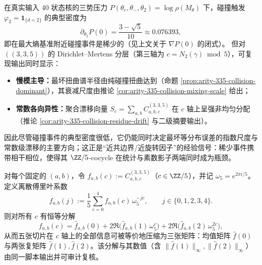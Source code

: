 \begin{corollary}\label{cor:arity-335-rare-collision-dominant}
在真实输入 40 状态核的三势压力 $P(\theta_e,\theta_-,\theta_2)=\log\rho(M_\theta)$ 下，碰撞触发 $\varphi_2=\mathbf{1}_{\{d=2\}}$ 的典型密度为
\[
\partial_{\theta_2}P(0)=\frac{3-\sqrt5}{10}\approx 0.076393,
\]
即在最大熵基准附近碰撞事件是稀少的（见上文关于 $\nabla P(0)$ 的闭式）。
但对 \(((3,3,5))\) 的 Dirichlet--Mertens 分层（第三轴为 $c=N_2(\gamma)\bmod 5$），可复现输出同时显示：
\begin{itemize}
  \item \textbf{慢模主导：}最坏扭曲谱半径由纯碰撞扭曲达到（命题 \ref{prop:arity-335-collision-dominant}），其衰减尺度由推论 \ref{cor:arity-335-collision-mixing-scale} 给出；
  \item \textbf{常数各向异性：}聚合漂移向量 $S_c=\sum_{a,b}C^{(3,3,5)}_{a,b,c}$ 在 $c$ 轴上呈强非均匀分配（推论 \ref{cor:arity-335-collision-residue-drift} 与二级摘要输出）。
\end{itemize}
因此尽管碰撞事件的典型密度很低，它仍能同时决定最坏等分布误差的指数尺度与常数级漂移的主要方向；这正是“近共边界/近旋转因子”的经验信号：稀少事件携带相干相位，使得其 \(\ZZ/5\)-cocycle 在统计与素数影子两端同时成为瓶颈。
\end{corollary}

\begin{proposition}\label{prop:arity-335-fourier-fingerprint}
对每个固定的 $(a,b)$，令 $f_{a,b}(c):=C^{(3,3,5)}_{a,b,c}$（$c\in\ZZ/5$），并记 $\omega_5=e^{2\pi i/5}$。定义离散傅里叶系数
\[
\widehat f_{a,b}(j):=\frac15\sum_{c=0}^{4} f_{a,b}(c)\,\omega_5^{-jc},
\qquad j\in\{0,1,2,3,4\}.
\]
则对所有 $c$ 有恒等分解
\[
f_{a,b}(c)
=\widehat f_{a,b}(0)
+2\Re\bigl(\widehat f_{a,b}(1)\,\omega_5^{c}\bigr)
+2\Re\bigl(\widehat f_{a,b}(2)\,\omega_5^{2c}\bigr),
\]
从而五张切片在 $c$ 轴上的全部信息可被等价地压缩为三张矩阵：均值矩阵 $\widehat f(0)$ 与两张复矩阵 $\widehat f(1),\widehat f(2)$。该分解与其数值（含 $\|\widehat f(1)\|_\infty,\|\widehat f(2)\|_\infty$）由同一脚本输出并可审计复核。
\end{proposition}

